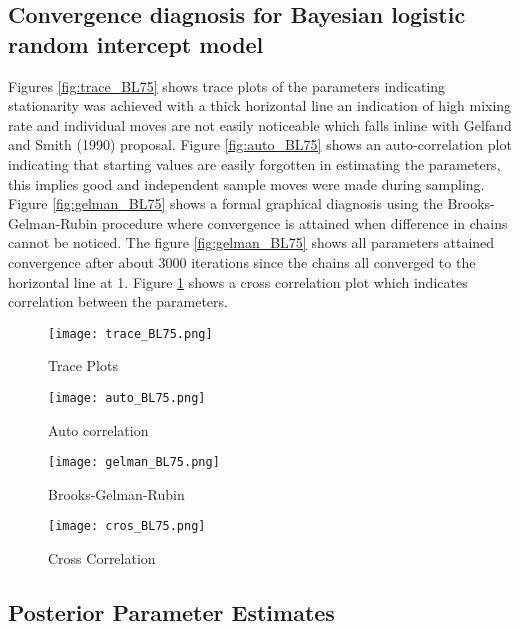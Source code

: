 \documentclass[11pt]{article}
\begin{document}
\subsection{Convergence diagnosis for Bayesian logistic random intercept model}

Figures \ref{fig:trace_BL75} shows trace plots of the parameters indicating stationarity was achieved with a thick horizontal line an indication of high mixing rate and individual moves are not easily noticeable which falls inline with Gelfand and Smith (1990) proposal. Figure \ref{fig:auto_BL75} shows an auto-correlation plot indicating that starting values are easily forgotten in estimating the parameters, this implies good and independent sample moves were made during sampling. Figure \ref{fig:gelman_BL75} shows a formal graphical diagnosis using the Brooks-Gelman-Rubin procedure where convergence is attained when difference in chains cannot be noticed. The figure \ref{fig:gelman_BL75} shows all parameters attained convergence after about 3000 iterations since the chains all converged to the horizontal line at 1. Figure \ref{fig:cros_BL75} shows a cross correlation plot which indicates correlation between the parameters.

    \begin{figure}[H]
  \begin{minipage}[b]{0.4\textwidth}
    \texttt{[image: trace\_BL75.png]}
    \caption{Trace Plots}
    \label{fig:trace_BL75}
  \end{minipage}
  \hfill
  \begin{minipage}[b]{0.45\textwidth}
    \texttt{[image: auto\_BL75.png]}
    \caption{Auto correlation}
    \label{fig:auto_BL75}
  \end{minipage}
    \hfill
  \begin{minipage}[b]{0.45\textwidth}
    \texttt{[image: gelman\_BL75.png]}
    \caption{Brooks-Gelman-Rubin}
    \label{fig:gelman_BL75}
  \end{minipage}
      \hfill
  \begin{minipage}[b]{0.45\textwidth}
    \texttt{[image: cros\_BL75.png]}
    \caption{Cross Correlation}
    \label{fig:cros_BL75}
  \end{minipage}
\end{figure}


\subsection{Posterior Parameter Estimates}
\end{document}
